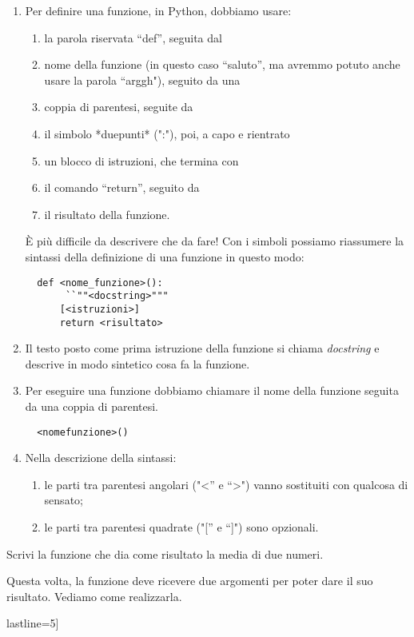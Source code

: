 \begin{osservazione}
 \begin{enumerate} [nosep]
  \item Per definire una funzione, in Python,  dobbiamo usare:
  \begin{enumerate} [noitemsep]
   \item la parola riservata  ``def'', seguita dal
   \item nome della funzione (in questo caso  ``saluto'', ma avremmo potuto 
anche usare la parola  ``arggh"), seguito da una
   \item coppia di parentesi, seguite da
   \item il simbolo *duepunti* (":"), poi, a capo e rientrato
   \item un blocco di istruzioni, che termina con
   \item il comando  ``return'', seguito da
   \item il risultato della funzione.
  \end{enumerate}

  È più difficile da descrivere che da fare!
  Con i simboli possiamo riassumere la sintassi della definizione di una 
funzione in questo modo:
\begin{lstlisting}
  def <nome_funzione>():
       ``""<docstring>"""
      [<istruzioni>]
      return <risultato>
\end{lstlisting}

  \item Il testo posto come prima istruzione della funzione si chiama 
\emph{docstring} e descrive in modo sintetico cosa fa la funzione.
  \item Per eseguire una funzione dobbiamo chiamare il nome della funzione 
seguita da una coppia di parentesi.
\begin{lstlisting}
  <nomefunzione>()
\end{lstlisting}
  \item Nella descrizione della sintassi:
  \begin{enumerate} [nosep]
   \item le parti tra parentesi angolari ("<'' e  ``>") vanno sostituiti 
con 
qualcosa di sensato;
   \item le parti tra parentesi quadrate ("['' e  ``]") sono opzionali.
  \end{enumerate}
 \end{enumerate}
\end{osservazione}

\begin{esempio}
 Scrivi la funzione che dia come risultato la media di due numeri.

Questa volta, la funzione deve ricevere due argomenti per poter dare il suo 
risultato. Vediamo come realizzarla.

lastline=5]
\end{esempio}

